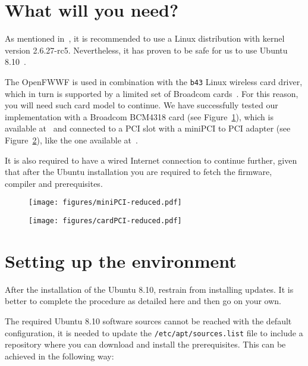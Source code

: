 \documentclass[conference]{IEEEtran}
\begin{document}
\section{What will you need?}\label{hardware}
As mentioned in~\cite{OpenFWWF}, it is recommended to use a Linux distribution with kernel version 2.6.27-rc5. 
Nevertheless, it has proven to be safe for us to use Ubuntu 8.10~\cite{ubuntu8}.

The OpenFWWF is used in combination with the \texttt{b43} Linux  wireless card driver, which in turn is supported by a limited set of Broadcom cards~\cite{b43-info}. For this reason, you will need such card model to continue. We have successfully tested our implementation with a Broadcom BCM4318 card (see Figure~\ref{fig:miniPCI}), which is available at~\cite{bcm4318} and connected to a PCI slot with a miniPCI to PCI adapter (see Figure~\ref{fig:PCI}), like the one available at~\cite{PCIAdapter}.

It is also required to have a wired Internet connection to continue further, given that after the Ubuntu installation you are required to fetch the firmware, compiler and prerequisites.

\begin{figure*}[t]
\centering
\begin{subfigure}{.5\textwidth}
  \centering
  \texttt{[image: figures/miniPCI-reduced.pdf]}
  \caption{}
  \label{fig:miniPCI}
\end{subfigure}%
\begin{subfigure}{.5\textwidth}
  \centering
  \texttt{[image: figures/cardPCI-reduced.pdf]}
  \caption{}
  \label{fig:PCI}
\end{subfigure}
\caption{\ref{fig:miniPCI}) Broadcom BCM418 miniPCI. \ref{fig:PCI}) Card correctly placed into the PCI adapter.}
\label{installedCard}
\end{figure*}

\section{Setting up the environment}
After the installation of the Ubuntu 8.10, restrain from installing updates. It is better to complete the procedure as detailed here and then go on your own.

The required Ubuntu 8.10 software sources cannot be reached with the default configuration, it is needed to update the \texttt{/etc/apt/sources.list} file to include a repository where you can download and install the prerequisites. This can be achieved in the following way: 
\end{document}
